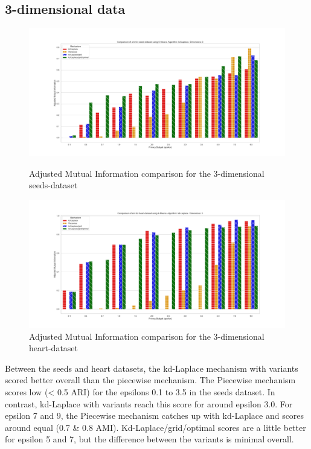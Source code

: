 \subsection{3-dimensional data}
\begin{figure}[H]
    \centering
    \begin{minipage}[c]{0.8\textwidth}
        \includegraphics[width=1\textwidth]{Results/RQ2/seeds-dataset/ami_seeds-dataset_comparison.png}
        \caption{Adjusted Mutual Information comparison for the 3-dimensional seeds-dataset}
        \label{fig:ami_seeds-dataset_comparison_3d}
    \end{minipage}
    \begin{minipage}[c]{0.8\textwidth}
        \includegraphics[width=1\textwidth]{Results/RQ2/heart-dataset/ami_heart-dataset_comparison.png}
        \caption{Adjusted Mutual Information comparison for the 3-dimensional heart-dataset}
        \label{fig:ami_heart-dataset_comparison_3d}
    \end{minipage}

\end{figure}
Between the seeds and heart datasets, the kd-Laplace mechanism with variants scored better overall than the piecewise mechanism.
The Piecewise mechanism scores low (< 0.5 ARI) for the epsilons 0.1 to 3.5 in the seeds dataset.
In contrast, kd-Laplace with variants reach this score for around epsilon 3.0.
For epsilon 7 and 9, the Piecewise mechanism catches up with kd-Laplace and scores around equal (0.7 \& 0.8 AMI).
Kd-Laplace/grid/optimal scores are a little better for epsilon 5 and 7, but the difference between the variants is minimal overall.

